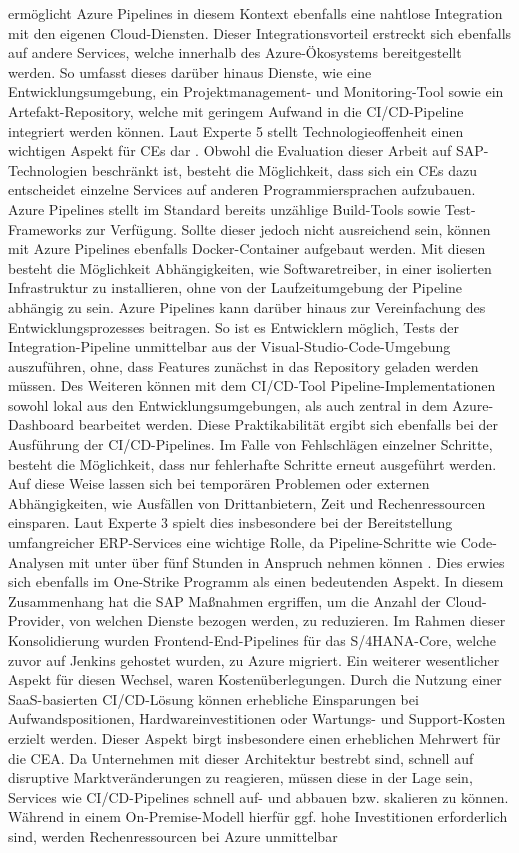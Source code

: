 ermöglicht Azure Pipelines in diesem Kontext ebenfalls eine nahtlose Integration mit den eigenen Cloud-Diensten. Dieser Integrationsvorteil erstreckt sich ebenfalls auf andere Services, welche innerhalb des Azure-Ökosystems bereitgestellt werden. So umfasst dieses darüber hinaus Dienste, wie eine Entwicklungsumgebung, ein Projektmanagement- und Monitoring-Tool sowie ein Artefakt-Repository, welche mit geringem Aufwand in die CI/CD-Pipeline integriert werden können. Laut Experte 5 stellt Technologieoffenheit einen wichtigen Aspekt für CEs dar \cite[Z. 8 ff.]{SoftwareArchitektSAPDTSIntegration.}. Obwohl die Evaluation dieser Arbeit auf SAP-Technologien beschränkt ist, besteht die Möglichkeit, dass sich ein CEs dazu entscheidet einzelne Services auf anderen Programmiersprachen aufzubauen. Azure Pipelines stellt im Standard bereits unzählige Build-Tools sowie Test-Frameworks zur Verfügung. Sollte dieser jedoch nicht ausreichend sein, können mit Azure Pipelines ebenfalls Docker-Container aufgebaut werden. Mit diesen besteht die Möglichkeit Abhängigkeiten, wie Softwaretreiber, in einer isolierten Infrastruktur zu installieren, ohne von der Laufzeitumgebung der Pipeline abhängig zu sein. Azure Pipelines kann darüber hinaus zur Vereinfachung des Entwicklungsprozesses beitragen. So ist es Entwicklern möglich, Tests der Integration-Pipeline unmittelbar aus der Visual-Studio-Code-Umgebung auszuführen, ohne, dass Features zunächst in das Repository geladen werden müssen. Des Weiteren können mit dem CI/CD-Tool Pipeline-Implementationen sowohl lokal aus den Entwicklungsumgebungen, als auch zentral in dem Azure-Dashboard bearbeitet werden. Diese Praktikabilität ergibt sich ebenfalls bei der Ausführung der CI/CD-Pipelines. Im Falle von Fehlschlägen einzelner Schritte, besteht die Möglichkeit, dass nur fehlerhafte Schritte erneut ausgeführt werden. Auf diese Weise lassen sich bei temporären Problemen oder externen Abhängigkeiten, wie Ausfällen von Drittanbietern, Zeit und Rechenressourcen einsparen. Laut Experte 3 spielt dies insbesondere bei der Bereitstellung umfangreicher ERP-Services eine wichtige Rolle, da Pipeline-Schritte wie Code-Analysen mit unter über fünf Stunden in Anspruch nehmen können \cite[Z. 20 ff.]{ProductManagerSAPHyperspaceSecurityTools.}. Dies erwies sich ebenfalls im One-Strike Programm als einen bedeutenden Aspekt. In diesem Zusammenhang hat die SAP Maßnahmen ergriffen, um die Anzahl der Cloud-Provider, von welchen Dienste bezogen werden, zu reduzieren. Im Rahmen dieser Konsolidierung wurden Frontend-End-Pipelines für das S/4HANA-Core, welche zuvor auf Jenkins gehostet wurden, zu Azure migriert. Ein weiterer wesentlicher Aspekt für diesen Wechsel, waren Kostenüberlegungen. Durch die Nutzung einer SaaS-basierten CI/CD-Lösung können erhebliche Einsparungen bei Aufwandspositionen, Hardwareinvestitionen oder Wartungs- und Support-Kosten erzielt werden. Dieser Aspekt birgt insbesondere einen erheblichen Mehrwert für die CEA. Da Unternehmen mit dieser Architektur bestrebt sind, schnell auf disruptive Marktveränderungen zu reagieren, müssen diese in der Lage sein, Services wie CI/CD-Pipelines schnell auf- und abbauen bzw. skalieren zu können. Während in einem On-Premise-Modell hierfür ggf. hohe Investitionen erforderlich sind, werden Rechenressourcen bei Azure unmittelbar 